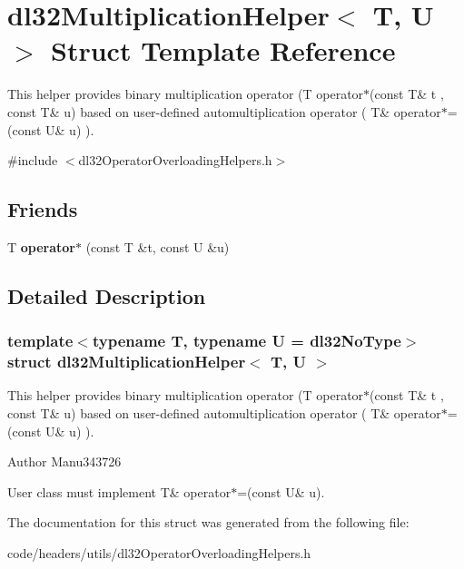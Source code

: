 \hypertarget{structdl32_multiplication_helper}{\section{dl32\-Multiplication\-Helper$<$ T, U $>$ Struct Template Reference}
\label{structdl32_multiplication_helper}
}


This helper provides binary multiplication operator (T operator$\ast$(const T\& t , const T\& u) based on user-\/defined automultiplication operator ( T\& operator$\ast$=(const U\& u) ).  




{\ttfamily \#include $<$dl32\-Operator\-Overloading\-Helpers.\-h$>$}

\subsection*{Friends}
\begin{DoxyCompactItemize}
\item 
\hypertarget{structdl32_multiplication_helper_af678cf44c6464924341ae8114f9f89df}{T {\bfseries operator$\ast$} (const T \&t, const U \&u)}\label{structdl32_multiplication_helper_af678cf44c6464924341ae8114f9f89df}

\end{DoxyCompactItemize}


\subsection{Detailed Description}
\subsubsection*{template$<$typename T, typename U = dl32\-No\-Type$>$struct dl32\-Multiplication\-Helper$<$ T, U $>$}

This helper provides binary multiplication operator (T operator$\ast$(const T\& t , const T\& u) based on user-\/defined automultiplication operator ( T\& operator$\ast$=(const U\& u) ). 

\begin{DoxyAuthor}{Author}
Manu343726
\end{DoxyAuthor}
User class must implement T\& operator$\ast$=(const U\& u). 

The documentation for this struct was generated from the following file\-:\begin{DoxyCompactItemize}
\item 
code/headers/utils/dl32\-Operator\-Overloading\-Helpers.\-h\end{DoxyCompactItemize}
